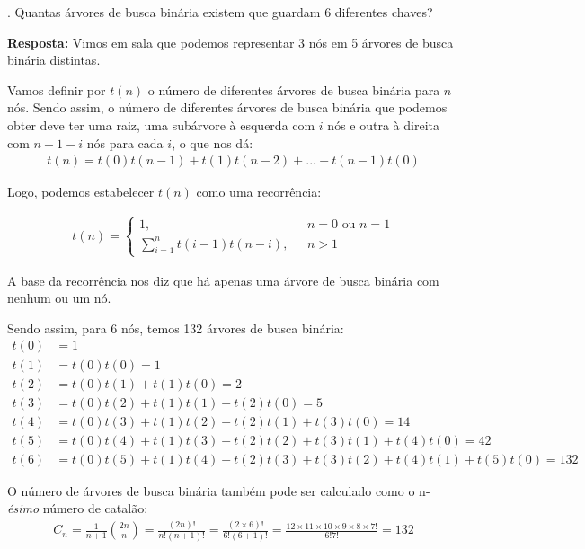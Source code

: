 
. Quantas árvores de busca binária existem que guardam 6 diferentes chaves?

\textbf{Resposta:} Vimos em sala que podemos representar 3 nós em 5 árvores de busca binária distintas.

Vamos definir por $t(n)$ o número de diferentes árvores de busca binária para $n$ nós. Sendo assim, o número de diferentes árvores de busca binária que podemos obter deve ter uma raiz, uma subárvore à esquerda com $i$ nós e outra à direita com $n-1-i$ nós para cada $i$, o que nos dá:
\begin{align*}
t(n) = t(0)t(n-1) + t(1)t(n-2) + ... + t(n-1)t(0)
\end{align*}

Logo, podemos estabelecer $t(n)$ como uma recorrência:

\begin{align*}
t(n) = \left\{ \begin{array}{rl} 
 1, &\mbox{ $n = 0$ ou $n = 1$} \\
 \sum_{i=1}^{n} t(i - 1) t(n -  i), &\mbox{ $n > 1 $}
       \end{array} \right.
\end{align*}

A base da recorrência nos diz que há apenas uma árvore de busca binária com nenhum ou um nó.

Sendo assim, para 6 nós, temos 132 árvores de busca binária:
\begin{align*}
t(0) &= 1 \\
t(1) &= t(0)t(0) = 1 \\
t(2) &= t(0)t(1) + t(1)t(0) = 2 \\
t(3) &= t(0)t(2) + t(1)t(1) + t(2)t(0) = 5 \\
t(4) &= t(0)t(3) + t(1)t(2) + t(2)t(1) + t(3)t(0) = 14 \\
t(5) &= t(0)t(4) + t(1)t(3) + t(2)t(2) + t(3)t(1) + t(4)t(0) = 42 \\
t(6) &= t(0)t(5) + t(1)t(4) + t(2)t(3) + t(3)t(2) + t(4)t(1) + t(5)t(0) = 132
\end{align*}

O número de árvores de busca binária também pode ser calculado como o n-\textit{ésimo} número de catalão:
\begin{align*}
C_n = \frac{1}{n + 1}\binom {2n}{n} = \frac{(2n)!}{n!(n + 1)!} = \frac{(2\times6)!}{6!(6 + 1)!} = \frac{12\times11\times10\times9\times8\times7!}{6!7!} = 132
\end{align*}\\[12pt]